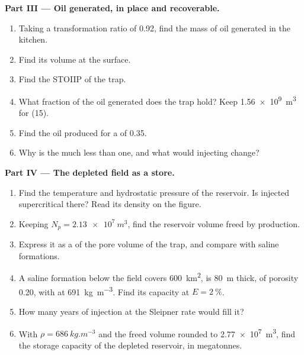 \begin{problem}
\noindent\textbf{Part III --- Oil generated, in place and recoverable.}
\begin{enumerate}[resume]
  \item Taking a transformation ratio of 0.92, find the mass of oil generated in the kitchen.
  \item Find its volume at the surface.
  \item Find the STOIIP of the trap.
  \item What fraction of the oil generated does the trap hold? Keep \qty{1.56e9}{m^3} for (15).
  \item Find the oil produced for a  of 0.35.
  \item Why is the  much less than one, and what would injecting  change?
\end{enumerate}

\noindent\textbf{Part IV --- The depleted field as a  store.}
\begin{enumerate}[resume]
  \item Find the temperature and hydrostatic pressure of the reservoir. Is injected 
        supercritical there? Read its density on the figure.
  \item Keeping $N_p = \qty{2.13e7}{m^3}$, find the reservoir volume freed by production.
  \item Express it as a  of the pore volume of the trap, and compare with
        saline formations.
  \item A saline formation below the field covers \qty{600}{km^2}, is \qty{80}{m} thick, of
        porosity 0.20, with  at \qty{691}{kg.m^{-3}}. Find its capacity at $E =
        \qty{2}{\percent}$.
  \item How many years of injection at the Sleipner rate would fill it?
  \item With $\rho = \qty{686}{kg.m^{-3}}$ and the freed volume rounded to \qty{2.77e7}{m^3}, find
        the  storage capacity of the depleted reservoir, in megatonnes.
\end{enumerate}
\end{problem}

